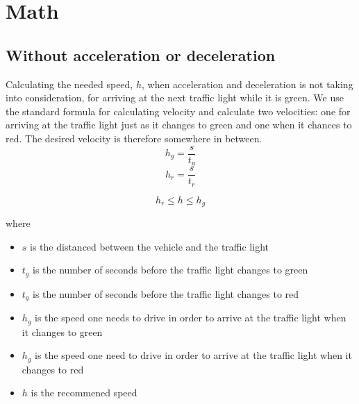 \section{Math}

\subsection{Without acceleration or deceleration}
Calculating the needed speed, $h$, when acceleration and deceleration is not taking into consideration, for arriving at the next traffic light while it is green.
We use the standard formula for calculating velocity and calculate two velocities: one for arriving at the traffic light just as it changes to green and one when it chances to red. The desired velocity is therefore somewhere in between.
\[h_g = \frac{s}{t_g}\]
\[h_r = \frac{s}{t_r}\]

\[h_r \leq h \leq h_g\]

where
\begin{itemize}
\item $s$ is the distanced between the vehicle and the traffic light
\item $t_g$ is the number of seconds before the traffic light changes to green
\item $t_g$ is the number of seconds before the traffic light changes to red
\item $h_g$ is the speed one needs to drive in order to arrive at the traffic light when it changes to green
\item $h_g$ is the speed one need to drive in order to arrive at the traffic light when it changes to red
\item $h$ is the recommened speed
\end{itemize}
